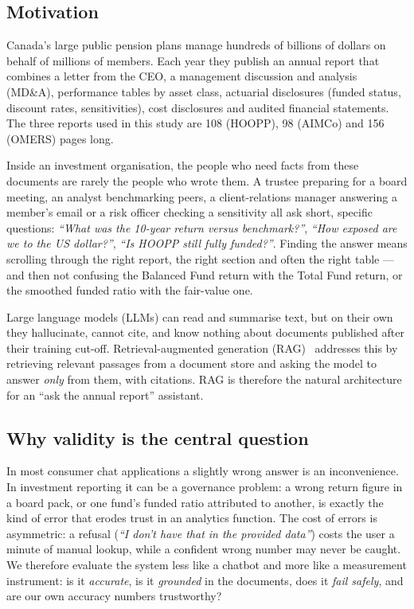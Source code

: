 \documentclass[11pt,a4paper]{article}
\begin{document}
\subsection{Motivation}
Canada's large public pension plans manage hundreds of billions of dollars on behalf of millions of members.
Each year they publish an annual report that combines a letter from the CEO, a management discussion and analysis
(MD\&A), performance tables by asset class, actuarial disclosures (funded status, discount rates, sensitivities),
cost disclosures and audited financial statements. The three reports used in this study are 108 (HOOPP), 98 (AIMCo)
and 156 (OMERS) pages long.

Inside an investment organisation, the people who need facts from these documents are rarely the people who
wrote them. A trustee preparing for a board meeting, an analyst benchmarking peers, a client-relations manager
answering a member's email or a risk officer checking a sensitivity all ask short, specific questions:
\emph{``What was the 10-year return versus benchmark?''}, \emph{``How exposed are we to the US dollar?''},
\emph{``Is HOOPP still fully funded?''}. Finding the answer means scrolling through the right report, the right
section and often the right table --- and then not confusing the Balanced Fund return with the Total Fund return,
or the smoothed funded ratio with the fair-value one.

Large language models (LLMs) can read and summarise text, but on their own they hallucinate, cannot cite, and
know nothing about documents published after their training cut-off. Retrieval-augmented generation
(RAG)~\citep{lewis2020rag,gao2023ragsurvey} addresses this by retrieving relevant passages from a document store
and asking the model to answer \emph{only} from them, with citations. RAG is therefore the natural architecture for
an ``ask the annual report'' assistant.

\subsection{Why validity is the central question}
In most consumer chat applications a slightly wrong answer is an inconvenience. In investment reporting it can be
a governance problem: a wrong return figure in a board pack, or one fund's funded ratio attributed to another, is
exactly the kind of error that erodes trust in an analytics function. The cost of errors is asymmetric: a refusal
(\emph{``I don't have that in the provided data''}) costs the user a minute of manual lookup, while a confident wrong
number may never be caught. We therefore evaluate the system less like a chatbot and more like a measurement
instrument: is it \emph{accurate}, is it \emph{grounded} in the documents, does it \emph{fail safely}, and are our
own accuracy numbers trustworthy?
\end{document}
